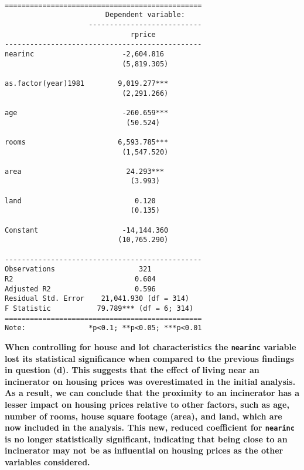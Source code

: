 \documentclass[
  letterpaper,
  DIV=11,
  numbers=noendperiod]{scrartcl}
\begin{document}
\begin{verbatim}

===============================================
                        Dependent variable:    
                    ---------------------------
                              rprice           
-----------------------------------------------
nearinc                     -2,604.816         
                            (5,819.305)        
                                               
as.factor(year)1981        9,019.277***        
                            (2,291.266)        
                                               
age                         -260.659***        
                             (50.524)          
                                               
rooms                      6,593.785***        
                            (1,547.520)        
                                               
area                         24.293***         
                              (3.993)          
                                               
land                           0.120           
                              (0.135)          
                                               
Constant                    -14,144.360        
                           (10,765.290)        
                                               
-----------------------------------------------
Observations                    321            
R2                             0.604           
Adjusted R2                    0.596           
Residual Std. Error    21,041.930 (df = 314)   
F Statistic           79.789*** (df = 6; 314)  
===============================================
Note:               *p<0.1; **p<0.05; ***p<0.01
\end{verbatim}

\textbf{When controlling for house and lot characteristics the
\texttt{nearinc} variable lost its statistical significance when
compared to the previous findings in question (d). This suggests that
the effect of living near an incinerator on housing prices was
overestimated in the initial analysis. As a result, we can conclude that
the proximity to an incinerator has a lesser impact on housing prices
relative to other factors, such as age, number of rooms, house square
footage (area), and land, which are now included in the analysis. This
new, reduced coefficient for \texttt{nearinc} is no longer statistically
significant, indicating that being close to an incinerator may not be as
influential on housing prices as the other variables considered.}
\end{document}
